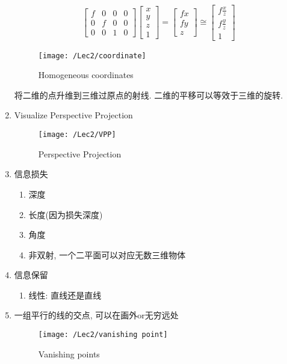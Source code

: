 \begin{enumerate}
    \begin{align*}
        \begin{bmatrix}
            f&0&0&0\\
            0&f&0&0\\
            0&0&1&0
        \end{bmatrix}\begin{bmatrix}
            x\\y\\z\\1
        \end{bmatrix}=\begin{bmatrix}
            fx\\fy\\z
        \end{bmatrix}\cong \begin{bmatrix}
            f\frac{x}{z}\\f\frac{y}{z}\\1
        \end{bmatrix}
    \end{align*}
    \begin{figure}[H]
        \centering
        \texttt{[image: /Lec2/coordinate]}
        \caption{Homogeneous coordinates}
    \end{figure}
    将二维的点升维到三维过原点的射线. 二维的平移可以等效于三维的旋转. 
    \item Visualize Perspective Projection
    \begin{figure}[H]
        \centering
        \texttt{[image: /Lec2/VPP]}
        \caption{Perspective Projection}
    \end{figure}
    \item 信息损失
    \begin{enumerate}
        \item 深度
        \item 长度(因为损失深度)
        \item 角度
        \item 非双射, 一个二平面可以对应无数三维物体
    \end{enumerate}
    \item 信息保留
    \begin{enumerate}
        \item 线性: 直线还是直线
    \end{enumerate}
    \item {}
    
    一组平行的线的交点, 可以在画外or无穷远处
    \begin{figure}[H]
        \centering
        \texttt{[image: /Lec2/vanishing point]}
        \caption{Vanishing points}
    \end{figure}


\end{enumerate}
